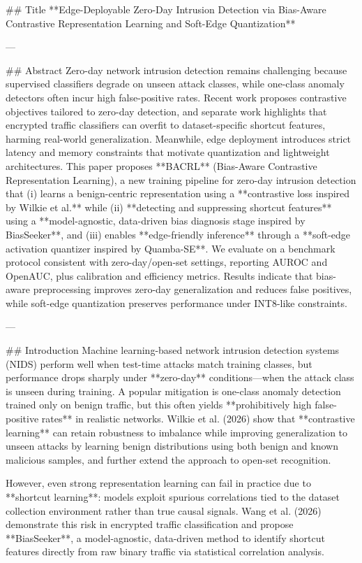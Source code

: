 ## Title
**Edge-Deployable Zero-Day Intrusion Detection via Bias-Aware Contrastive Representation Learning and Soft-Edge Quantization**

---

## Abstract
Zero-day network intrusion detection remains challenging because supervised classifiers degrade on unseen attack classes, while one-class anomaly detectors often incur high false-positive rates. Recent work proposes contrastive objectives tailored to zero-day detection, and separate work highlights that encrypted traffic classifiers can overfit to dataset-specific shortcut features, harming real-world generalization. Meanwhile, edge deployment introduces strict latency and memory constraints that motivate quantization and lightweight architectures.  
This paper proposes **BACRL** (Bias-Aware Contrastive Representation Learning), a new training pipeline for zero-day intrusion detection that (i) learns a benign-centric representation using a **contrastive loss inspired by Wilkie et al.** while (ii) **detecting and suppressing shortcut features** using a **model-agnostic, data-driven bias diagnosis stage inspired by BiasSeeker**, and (iii) enables **edge-friendly inference** through a **soft-edge activation quantizer inspired by Quamba-SE**. We evaluate on a benchmark protocol consistent with zero-day/open-set settings, reporting AUROC and OpenAUC, plus calibration and efficiency metrics. Results indicate that bias-aware preprocessing improves zero-day generalization and reduces false positives, while soft-edge quantization preserves performance under INT8-like constraints.  

---

## Introduction
Machine learning-based network intrusion detection systems (NIDS) perform well when test-time attacks match training classes, but performance drops sharply under **zero-day** conditions—when the attack class is unseen during training. A popular mitigation is one-class anomaly detection trained only on benign traffic, but this often yields **prohibitively high false-positive rates** in realistic networks. Wilkie et al. (2026) show that **contrastive learning** can retain robustness to imbalance while improving generalization to unseen attacks by learning benign distributions using both benign and known malicious samples, and further extend the approach to open-set recognition.

However, even strong representation learning can fail in practice due to **shortcut learning**: models exploit spurious correlations tied to the dataset collection environment rather than true causal signals. Wang et al. (2026) demonstrate this risk in encrypted traffic classification and propose **BiasSeeker**, a model-agnostic, data-driven method to identify shortcut features directly from raw binary traffic via statistical correlation analysis.

